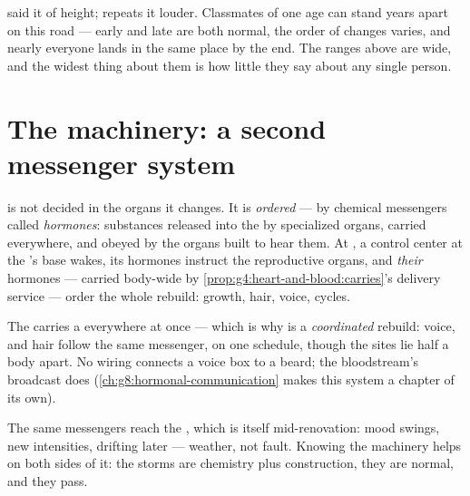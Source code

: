 \begin{remark}\label{rem:g8:puberty:timetable}
 said it of height;
 repeats it louder. Classmates of one age can stand
years apart on this road --- early and late are both
normal, the order of changes varies, and nearly everyone
lands in the same place by the end. The ranges above are
wide, and the widest thing about them is how little they
say about any single person.
\end{remark}

\section{The machinery: a second messenger system}

\begin{definition}\label{def:g8:puberty:hormones}
 is not decided in the organs it changes. It is
\emph{ordered} --- by chemical messengers called
\emph{hormones}: substances released into
the \emph{} by specialized organs, carried
everywhere, and obeyed by the organs built to hear them.
At , a control center at the 's base wakes,
its hormones instruct the reproductive organs, and
\emph{their} hormones --- carried body-wide by
\cref{prop:g4:heart-and-blood:carries}'s delivery service
--- order the whole rebuild: growth, hair, voice, cycles.
\end{definition}

\begin{example}\label{ex:g8:puberty:sites}
The  carries a  everywhere at once --- which
is why  is a \emph{coordinated} rebuild: voice,
 and hair follow the same messenger, on one
schedule, though the sites lie half a body apart. No
 wiring connects a voice box to a beard; the
bloodstream's broadcast does
(\cref{ch:g8:hormonal-communication} makes this system a
chapter of its own).
\end{example}

\begin{remark}\label{rem:g8:puberty:moods}
The same messengers reach the , which is itself
mid-renovation: mood swings, new intensities, 
drifting later --- weather, not fault. Knowing the
machinery helps on both sides of it: the storms are
chemistry plus construction, they are normal, and they
pass.
\end{remark}

